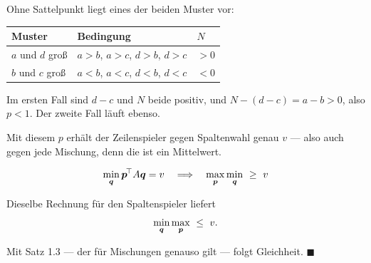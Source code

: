 \begin{merksatz}
Ohne Sattelpunkt liegt eines der beiden Muster vor:
\begin{center}
{\small
\renewcommand{\arraystretch}{1.5}
\begin{tabular}{@{}P{2.6cm}P{3.0cm}P{2.4cm}@{}}
\toprule
\textbf{Muster} & \textbf{Bedingung} & $N$\\
\midrule
$a$ und $d$ groß & $a>b$, $a>c$, $d>b$, $d>c$ & $>0$\\
$b$ und $c$ groß & $a<b$, $a<c$, $d<b$, $d<c$ & $<0$\\
\bottomrule
\end{tabular}}
\end{center}

Im ersten Fall sind $d-c$ und $N$ beide positiv, und $N - (d-c) = a-b > 0$, also $p < 1$. Der zweite Fall läuft ebenso. \checkmark

Mit diesem $p$ erhält der Zeilenspieler gegen  Spaltenwahl genau $v$ --- also auch gegen jede Mischung, denn die ist ein Mittelwert.

\[ \min_{\vek q} \vek p^{\!\top} A \vek q = v \quad\Longrightarrow\quad \max_{\vek p}\min_{\vek q} \ \ge\ v \]

Dieselbe Rechnung für den Spaltenspieler liefert
\[ \min_{\boldsymbol{q}}\max_{\boldsymbol{p}} \ \le\ v . \]

Mit Satz 1.3 --- der für Mischungen genauso gilt --- folgt Gleichheit. $\blacksquare$

\begin{center}
\begin{minipage}{0.88\textwidth}
\end{minipage}
\end{center}
\end{merksatz}

